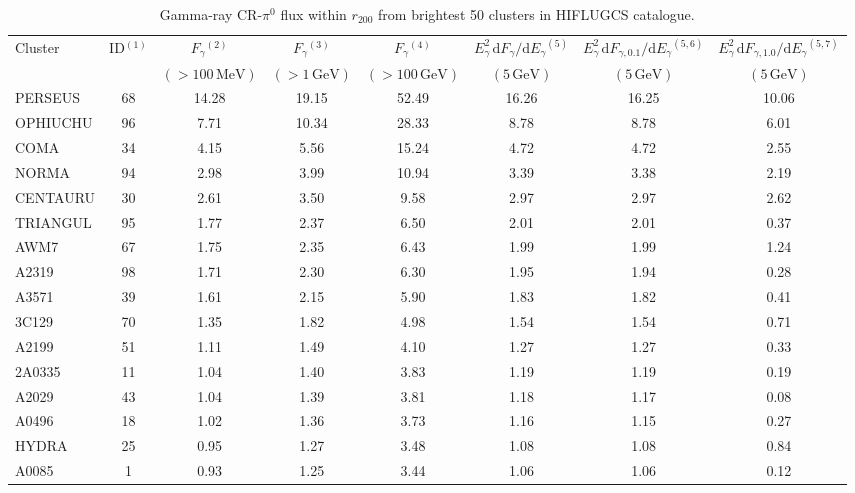 \documentclass[10pt,aps,pra,reprint,amsmath,amsfonts,amssymb,showpacs,nofootinbib,floatfix]{revtex4-1}
\newcommand{\rmn}{\mathrm}
\newcommand{\vstt}{\vspace{-0.0mm}}
\newcommand{\dd}{\rmn{d}}
\newcommand{\rvir}{r_{200}}
\newcommand{\eg}{E_\gamma}
\begin{document}
\begin{table}
\begin{minipage}{2.0\columnwidth}
  \caption{Gamma-ray CR-$\pi^0$ flux within $\rvir$ from brightest 50 clusters in HIFLUGCS catalogue.}
\begin{tabular}{l c c c c c c c}
\hline
\hline
 Cluster & ID$^{(1)}$ & $F_{\gamma}$$^{(2)}$ & $F_{\gamma}$$^{(3)}$&
 $F_{\gamma}$$^{(4)}$ & $\eg^2\,\dd F_{\gamma}/\dd \eg$$^{(5)}$ &
 $\eg^2\,\dd F_{\gamma,0.1}/\dd \eg$$^{(5,6)}$ &
 $\eg^2\,\dd F_{\gamma,1.0}/\dd \eg$$^{(5,7)}$\\
  & & $(>100\,\rmn{MeV})$ & $(>1\,\rmn{GeV})$ & $(>100\,\rmn{GeV})$ &
 $(5\,\rmn{GeV})$ & $(5\,\rmn{GeV})$ & $(5\,\rmn{GeV})$\\
 \hline
PERSEUS  &  68 &  14.28 &  19.15 &  52.49 &  16.26 &  16.25 &  10.06 \vstt \\
OPHIUCHU &  96 &   7.71 &  10.34 &  28.33 &   8.78 &   8.78 &   6.01 \vstt \\
COMA     &  34 &   4.15 &   5.56 &  15.24 &   4.72 &   4.72 &   2.55 \vstt \\
NORMA    &  94 &   2.98 &   3.99 &  10.94 &   3.39 &   3.38 &   2.19 \vstt \\
CENTAURU &  30 &   2.61 &   3.50 &   9.58 &   2.97 &   2.97 &   2.62 \vstt \\
TRIANGUL &  95 &   1.77 &   2.37 &   6.50 &   2.01 &   2.01 &   0.37 \vstt \\
AWM7     &  67 &   1.75 &   2.35 &   6.43 &   1.99 &   1.99 &   1.24 \vstt \\
A2319    &  98 &   1.71 &   2.30 &   6.30 &   1.95 &   1.94 &   0.28 \vstt \\
A3571    &  39 &   1.61 &   2.15 &   5.90 &   1.83 &   1.82 &   0.41 \vstt \\
3C129    &  70 &   1.35 &   1.82 &   4.98 &   1.54 &   1.54 &   0.71 \vstt \\
A2199    &  51 &   1.11 &   1.49 &   4.10 &   1.27 &   1.27 &   0.33 \vstt \\
2A0335   &  11 &   1.04 &   1.40 &   3.83 &   1.19 &   1.19 &   0.19 \vstt \\
A2029    &  43 &   1.04 &   1.39 &   3.81 &   1.18 &   1.17 &   0.08 \vstt \\
A0496    &  18 &   1.02 &   1.36 &   3.73 &   1.16 &   1.15 &   0.27 \vstt \\
HYDRA    &  25 &   0.95 &   1.27 &   3.48 &   1.08 &   1.08 &   0.84 \vstt \\
A0085    &   1 &   0.93 &   1.25 &   3.44 &   1.06 &   1.06 &   0.12 \vstt \\

\end{tabular}
\end{minipage}
\end{table}
\end{document}
